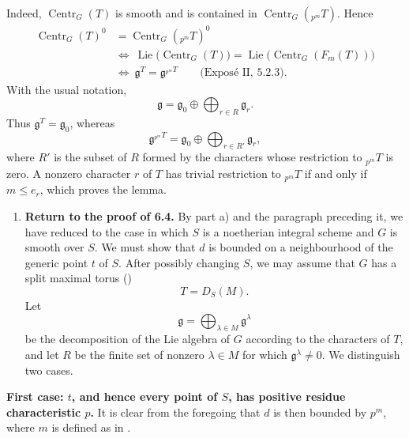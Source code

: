 Indeed, \(\operatorname{Centr}_G(T)\) is smooth and is contained in
\(\operatorname{Centr}_G({}_{p^m}T)\). Hence
\[
\begin{aligned}
\operatorname{Centr}_G(T)^0
 &=\operatorname{Centr}_G({}_{p^m}T)^0\\
&\Longleftrightarrow\
\operatorname{Lie}\bigl(\operatorname{Centr}_G(T)\bigr)
 =\operatorname{Lie}\bigl(\operatorname{Centr}_G(F_m(T))\bigr)\\
&\Longleftrightarrow\
\mathfrak g^T=\mathfrak g^{{}_{p^m}T}
\qquad\text{(Exposé II, 5.2.3).}
\end{aligned}
\]
With the usual notation,
\[
\mathfrak g=\mathfrak g_0\oplus\bigoplus_{r\in R}\mathfrak g_r.
\]
Thus \(\mathfrak g^T=\mathfrak g_0\), whereas
\[
\mathfrak g^{{}_{p^m}T}
 =\mathfrak g_0\oplus\bigoplus_{r\in R'}\mathfrak g_r,
\]
where \(R'\) is the subset of \(R\) formed by the characters whose restriction
to \({}_{p^m}T\) is zero. A nonzero character \(r\) of \(T\) has trivial
restriction to \({}_{p^m}T\) if and only if \(m\leq e_r\), which proves the
lemma.

\begin{enumerate}
\renewcommand{\labelenumi}{\alph{enumi})}
\setcounter{enumi}{2}
\item \textbf{Return to the proof of 6.4.}
By part a) and the paragraph preceding it, we have reduced to the case in
which \(S\) is a noetherian integral scheme and \(G\) is smooth over \(S\).
We must show that \(d\) is bounded on a neighbourhood of the generic point
\(t\) of \(S\). After possibly changing \(S\), we may assume that \(G\) has
a split maximal torus (\SGARefLink{sga3:xv:proposition:6-2}{6.2})
\[
T=D_S(M).
\]
Let
\[
\mathfrak g=\bigoplus_{\lambda\in M}\mathfrak g^\lambda
\]
be the decomposition of the Lie algebra of \(G\) according to the characters
of \(T\), and let \(R\) be the finite set of nonzero \(\lambda\in M\) for
which \(\mathfrak g^\lambda\neq0\). We distinguish two cases.
\end{enumerate}

\textbf{First case: \(t\), and hence every point of \(S\), has positive
residue characteristic \(p\).}
It is clear from the foregoing that \(d\) is then bounded by \(p^m\), where
\(m\) is defined as in .

